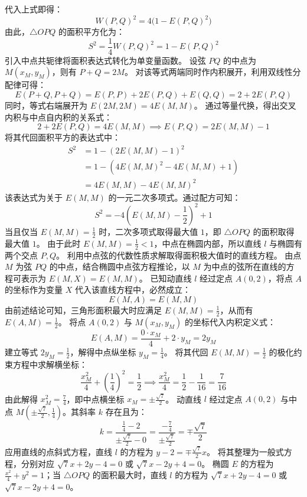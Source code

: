 \begin{solution}
代入上式即得：
\[ W(P, Q)^2 = 4 \big( 1 - E(P, Q)^2 \big) \]
由此，$\triangle OPQ$ 的面积平方化为：
\[ S^2 = \frac{1}{4} W(P, Q)^2 = 1 - E(P, Q)^2 \]
引入中点共轭律将面积表达式转化为单变量函数。
设弦 $PQ$ 的中点为 $M(x_M, y_M)$，则有 $P + Q = 2M$。
对该等式两端同时作内积展开，利用双线性分配律可得：
\[ E(P+Q, P+Q) = E(P, P) + 2E(P, Q) + E(Q, Q) = 2 + 2E(P, Q) \]
同时，等式右端展开为 $E(2M, 2M) = 4E(M, M)$。
通过等量代换，得出交叉内积与中点自内积的关系式：
\[ 2 + 2E(P, Q) = 4E(M, M) \implies E(P, Q) = 2E(M, M) - 1 \]
将其代回面积平方的表达式中：
\begin{align*}
S^2 &= 1 - \left( 2E(M, M) - 1 \right)^2 \\
&= 1 - \left( 4E(M, M)^2 - 4E(M, M) + 1 \right) \\
&= 4E(M, M) - 4E(M, M)^2
\end{align*}
该表达式为关于 $E(M, M)$ 的一元二次多项式。通过配方可知：
\[ S^2 = -4\left(E(M, M) - \frac{1}{2}\right)^2 + 1 \]
当且仅当 $E(M, M) = \frac{1}{2}$ 时，二次多项式取得最大值 $1$，即 $\triangle OPQ$ 的面积取得最大值 $1$。
由于此时 $E(M, M) = \frac{1}{2} < 1$，中点在椭圆内部，所以直线 $l$ 与椭圆有两个交点 $P, Q$。
利用中点弦的代数性质求解取得面积极大值时的直线方程。
由点 $M$ 为弦 $PQ$ 的中点，结合椭圆中点弦方程推论，以 $M$ 为中点的弦所在直线的方程可表示为 $E(M, X) = E(M, M)$。
已知动直线 $l$ 经过定点 $A(0, 2)$，将点 $A$ 的坐标作为变量 $X$ 代入该直线方程中，必然成立：
\[ E(M, A) = E(M, M) \]
由前述结论可知，三角形面积最大时应满足 $E(M, M) = \frac{1}{2}$，从而有 $E(A, M) = \frac{1}{2}$。
将点 $A(0, 2)$ 与 $M(x_M, y_M)$ 的坐标代入内积定义式：
\[ E(A, M) = \frac{0 \cdot x_M}{4} + 2 \cdot y_M = 2y_M \]
建立等式 $2y_M = \frac{1}{2}$，解得中点纵坐标 $y_M = \frac{1}{4}$。
将其代回 $E(M, M) = \frac{1}{2}$ 的极化约束方程中求解横坐标：
\[ \frac{x_M^2}{4} + \left( \frac{1}{4} \right)^2 = \frac{1}{2} \implies \frac{x_M^2}{4} = \frac{1}{2} - \frac{1}{16} = \frac{7}{16} \]
由此解得 $x_M^2 = \frac{7}{4}$，即中点横坐标 $x_M = \pm \frac{\sqrt{7}}{2}$。
动直线 $l$ 经过定点 $A(0, 2)$ 与中点 $M\left( \pm \frac{\sqrt{7}}{2}, \frac{1}{4} \right)$。其斜率 $k$ 存在且为：
\[ k = \frac{\frac{1}{4} - 2}{\pm \frac{\sqrt{7}}{2} - 0} = \frac{-\frac{7}{4}}{\pm \frac{\sqrt{7}}{2}} = \mp \frac{\sqrt{7}}{2} \]
应用直线的点斜式方程，直线 $l$ 的方程为 $y - 2 = \mp \frac{\sqrt{7}}{2} x$。
将其整理为一般式方程，分别对应 $\sqrt{7}x + 2y - 4 = 0$ 或 $\sqrt{7}x - 2y + 4 = 0$。
椭圆 $E$ 的方程为 $\frac{x^2}{4} + y^2 = 1$；当 $\triangle OPQ$ 的面积最大时，直线 $l$ 的方程为 $\sqrt{7}x + 2y - 4 = 0$ 或 $\sqrt{7}x - 2y + 4 = 0$。
\end{solution}

